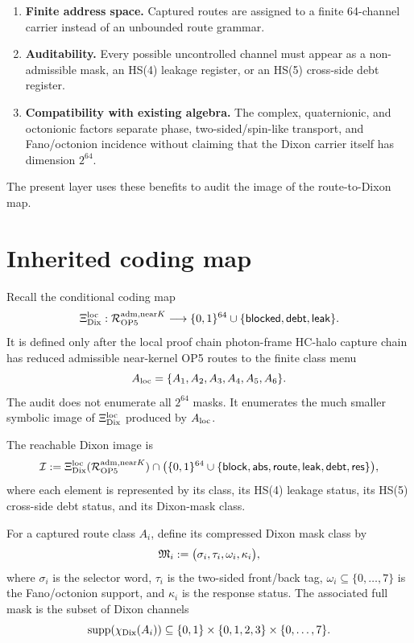 \begin{enumerate}[label=(\roman*)]
\item \textbf{Finite address space.} Captured routes are assigned to a finite 64-channel carrier instead of an unbounded route grammar.
\item \textbf{Auditability.} Every possible uncontrolled channel must appear as a non-admissible mask, an HS(4) leakage register, or an HS(5) cross-side debt register.
\item \textbf{Compatibility with existing algebra.} The complex, quaternionic, and octonionic factors separate phase, two-sided/spin-like transport, and Fano/octonion incidence without claiming that the Dixon carrier itself has dimension \(2^{64}\).
\end{enumerate}

The present layer uses these benefits to audit the image of the route-to-Dixon map.

\section{Inherited coding map}

Recall the conditional coding map
\[
\Xi_{\mathrm{Dix}}^{\mathrm{loc}}:\mathcal R_{\mathrm{OP} 5}^{\mathrm{adm},\mathrm{near} K}\longrightarrow
\{0,1\}^{64}\cup\{\mathsf{blocked},\mathsf{debt},\mathsf{leak}\}.
\]
It is defined only after the local proof chain photon-frame HC-halo capture chain has reduced admissible near-kernel OP5 routes to the finite class menu
\[
A_{\mathrm{loc}}=\{A_1,A_2,A_3,A_4,A_5,A_6\}.
\]
The audit does not enumerate all \(2^{64}\) masks. It enumerates the much smaller symbolic image of \(\Xi_{\mathrm{Dix}}^{\mathrm{loc}}\) produced by \(A_{\mathrm{loc}}\).

\begin{definition}
The reachable Dixon image is
\[
\mathcal I:=\Xi_{\mathrm{Dix}}^{\mathrm{loc}}(\mathcal R_{\mathrm{OP} 5}^{\mathrm{adm},\mathrm{near} K})\cap
\bigl(\{0,1\}^{64}\cup\{\mathsf{block},\mathsf{abs},\mathsf{route},\mathsf{leak},\mathsf{debt},\mathsf{res}\}\bigr),
\]
where each element is represented by its class, its HS(4) leakage status, its HS(5) cross-side debt status, and its Dixon-mask class.
\end{definition}

\begin{definition}
For a captured route class \(A_i\), define its compressed Dixon mask class by
\[
\mathfrak M_i
:=
\bigl(\sigma_i,\tau_i,\omega_i,\kappa_i\bigr),
\]
where \(\sigma_i\) is the selector word, \(\tau_i\) is the two-sided front/back tag, \(\omega_i\subseteq\{0,\ldots,7\}\) is the Fano/octonion support, and \(\kappa_i\) is the response status. The associated full mask is the subset of Dixon channels
\[
\operatorname{supp}(\chi_{\mathrm{Dix}}(A_i))
\subseteq
\{0,1\}\times\{0,1,2,3\}\times\{0,\ldots,7\}.
\]
\end{definition}

